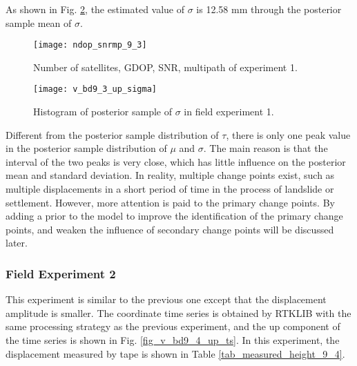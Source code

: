 \documentclass[final,3p,times]{elsarticle}
\begin{document}
	
	As shown in Fig. \ref{fig_v_bd9_3_up_sigma}, the estimated value of $\sigma$ is 12.58 mm through the posterior sample mean of $\sigma$.
	\begin{figure}[htbp]
		\centering
		\texttt{[image: ndop\_snrmp\_9\_3]}
		\caption{Number of satellites, GDOP, SNR, multipath of experiment 1.}
		\label{fig_v_ndop_snrmp_9_3}
	\end{figure} 
	\begin{figure}[htbp]
		\centering
		\texttt{[image: v\_bd9\_3\_up\_sigma]}
		\caption{Histogram of posterior sample of $\sigma$ in field experiment 1.}
		\label{fig_v_bd9_3_up_sigma}
	\end{figure} 
	Different from the posterior sample distribution of $\tau$, there is only one peak value in the posterior sample distribution of $\mu$ and $\sigma$.
	The main reason is that the interval of the two peaks is very close, which has little influence on the posterior mean and standard deviation.
	In reality, multiple change points exist, such as multiple displacements in a short period of time in the process of landslide or settlement.
	However, more attention is paid to the primary change points.
	By adding a prior to the model to improve the identification of the primary change points, and weaken the influence of secondary change points will be discussed later.
	\subsubsection{Field Experiment 2}%
	This experiment is similar to the previous one except that the displacement amplitude is smaller. 
	The coordinate time series is obtained by RTKLIB with the same processing strategy as the previous experiment, and the up component of the time series is shown in Fig. \ref{fig_v_bd9_4_up_ts}. 
	In this experiment, the displacement measured by tape is shown in Table \ref{tab_measured_height_9_4}.
	
\end{document}
